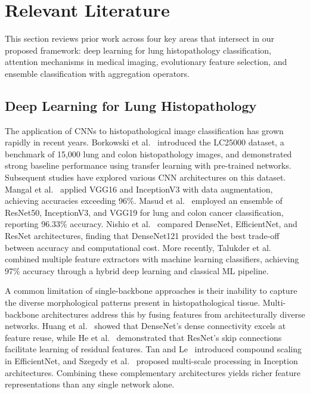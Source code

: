 \documentclass{article}
\begin{document}
\section{Relevant Literature}

This section reviews prior work across four key areas that intersect in our proposed framework: deep learning for lung histopathology classification, attention mechanisms in medical imaging, evolutionary feature selection, and ensemble classification with aggregation operators.

\subsection{Deep Learning for Lung Histopathology}

The application of CNNs to histopathological image classification has grown rapidly in recent years. Borkowski et al.~\cite{borkowski2019lung} introduced the LC25000 dataset, a benchmark of 15,000 lung and colon histopathology images, and demonstrated strong baseline performance using transfer learning with pre-trained networks. Subsequent studies have explored various CNN architectures on this dataset. Mangal et al.~\cite{mangal2020convolution} applied VGG16 and InceptionV3 with data augmentation, achieving accuracies exceeding 96\%. Masud et al.~\cite{masud2021machine} employed an ensemble of ResNet50, InceptionV3, and VGG19 for lung and colon cancer classification, reporting 96.33\% accuracy. Nishio et al.~\cite{nishio2021lung} compared DenseNet, EfficientNet, and ResNet architectures, finding that DenseNet121 provided the best trade-off between accuracy and computational cost. More recently, Talukder et al.~\cite{talukder2022machine} combined multiple feature extractors with machine learning classifiers, achieving 97\% accuracy through a hybrid deep learning and classical ML pipeline.

A common limitation of single-backbone approaches is their inability to capture the diverse morphological patterns present in histopathological tissue. Multi-backbone architectures address this by fusing features from architecturally diverse networks. Huang et al.~\cite{huang2017densely} showed that DenseNet's dense connectivity excels at feature reuse, while He et al.~\cite{he2016deep} demonstrated that ResNet's skip connections facilitate learning of residual features. Tan and Le~\cite{tan2019efficientnet} introduced compound scaling in EfficientNet, and Szegedy et al.~\cite{szegedy2016rethinking} proposed multi-scale processing in Inception architectures. Combining these complementary architectures yields richer feature representations than any single network alone.
\end{document}
